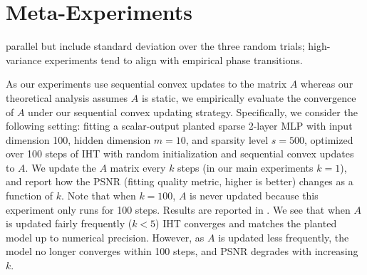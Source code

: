 \documentclass{article} %
\newcommand{\1}{\ensuremath{{\sf (i)}}}
\newcommand{\2}{\ensuremath{{\sf (ii)}}}
\newcommand{\3}{\ensuremath{{\sf (iii)}}}
\newcommand{\4}{\ensuremath{{\sf (iv)}}}
\newcommand{\5}{\ensuremath{{\sf (v)}}}
\newcommand{\6}{\ensuremath{{\sf (vi)}}}
\begin{document}
\section{Meta-Experiments}
\label{sec:more_experiments}

 parallel  but include standard deviation over the three random trials; high-variance experiments tend to align with empirical phase transitions.

As our experiments use sequential convex updates to the matrix $A$ whereas our theoretical analysis assumes $A$ is static, we empirically evaluate the convergence of $A$ under our sequential convex updating strategy. Specifically, we consider the following setting: fitting a scalar-output planted sparse 2-layer MLP with input dimension 100, hidden dimension $m=10$, and sparsity level $s=500$, optimized over 100 steps of IHT with random initialization and sequential convex updates to $A$. We update the $A$ matrix every $k$ steps (in our main experiments $k=1$), and report how the PSNR (fitting quality metric, higher is better) changes as a function of $k$. Note that when $k=100$, $A$ is never updated because this experiment only runs for 100 steps. Results are reported in . We see that when $A$ is updated fairly frequently ($k<5$) IHT converges and matches the planted model up to numerical precision. However, as $A$ is updated less frequently, the model no longer converges within 100 steps, and PSNR degrades with increasing $k$.
\end{document}
